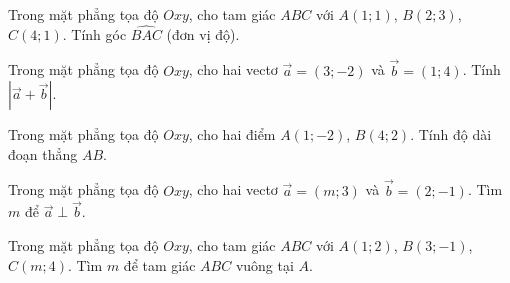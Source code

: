\begin{bt}%
Trong mặt phẳng tọa độ $Oxy$, cho tam giác $ABC$ với $A(1;1)$, $B(2;3)$, $C(4;1)$. Tính góc $\widehat{BAC}$ (đơn vị độ).
\end{bt}

\begin{bt}%
Trong mặt phẳng tọa độ $Oxy$, cho hai vectơ $\overrightarrow{a}=(3;-2)$ và $\overrightarrow{b}=(1;4)$. Tính $|\overrightarrow{a}+\overrightarrow{b}|$.
\end{bt}

\begin{bt}%
Trong mặt phẳng tọa độ $Oxy$, cho hai điểm $A(1;-2)$, $B(4;2)$. Tính độ dài đoạn thẳng $AB$.
\end{bt}

\begin{bt}%
Trong mặt phẳng tọa độ $Oxy$, cho hai vectơ $\overrightarrow{a}=(m;3)$ và $\overrightarrow{b}=(2;-1)$. Tìm $m$ để $\overrightarrow{a}\perp\overrightarrow{b}$.
\end{bt}

\begin{bt}%
Trong mặt phẳng tọa độ $Oxy$, cho tam giác $ABC$ với $A(1;2)$, $B(3;-1)$, $C(m;4)$. Tìm $m$ để tam giác $ABC$ vuông tại $A$.
\end{bt}

